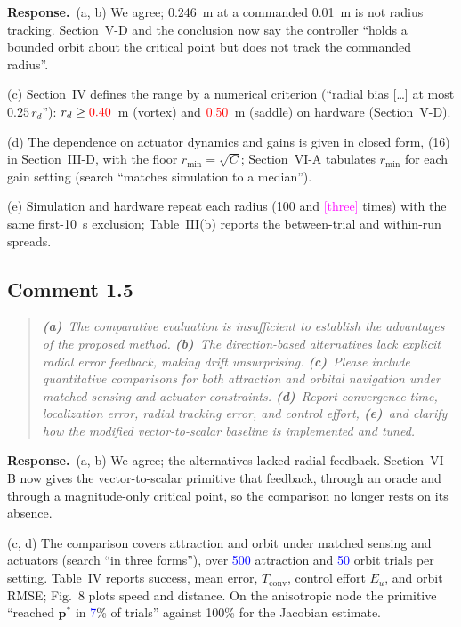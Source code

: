 \documentclass[10pt]{article}
\newcommand{\syn}[1]{\textcolor{red}{#1}}            %
\newcommand{\rev}[1]{#1}                             %
\newcommand{\open}[1]{\textcolor{magenta}{[#1]}}     %
\newcommand{\newnum}[1]{\textcolor{blue}{#1}}        %
\newcommand{\resp}{\par\textbf{Response.}~}
\begin{document}
\resp (a, b) We agree; 0.246~m at a commanded 0.01~m is not radius tracking. Section~V-D and the conclusion now say the controller ``holds a bounded orbit about the critical point but does not track the commanded radius''.

(c) Section~IV defines the range by a numerical criterion (``radial bias [\ldots] at most $0.25\,r_d$''): $r_d \ge \syn{0.40}$~m (vortex) and $\syn{0.50}$~m (saddle) on hardware (Section~V-D).

(d) The dependence on actuator dynamics and gains is given in closed form, (16) in Section~III-D, with the floor $r_{\min} = \sqrt{C}$; Section~VI-A tabulates $r_{\min}$ for each gain setting (search ``matches simulation to a median'').

(e) Simulation and hardware repeat each radius (\rev{100} and \open{three} times) with the same first-10~s exclusion; Table~III(b) reports the between-trial and within-run spreads.

\subsection*{Comment 1.5}

\begin{quote}\itshape
\textbf{(a)}~The comparative evaluation is insufficient to establish the advantages of the proposed method.
\textbf{(b)}~The direction-based alternatives lack explicit radial error feedback, making drift unsurprising.
\textbf{(c)}~Please include quantitative comparisons for both attraction and orbital navigation under matched sensing and actuator constraints.
\textbf{(d)}~Report convergence time, localization error, radial tracking error, and control effort,
\textbf{(e)}~and clarify how the modified vector-to-scalar baseline is implemented and tuned.
\end{quote}

\resp (a, b) We agree; the alternatives lacked radial feedback. Section~VI-B now gives the vector-to-scalar primitive that feedback, through an oracle and through a magnitude-only critical point, so the comparison no longer rests on its absence.

(c, d) The comparison covers attraction and orbit under matched sensing and actuators (search ``in three forms''), over \newnum{500} attraction and \newnum{50} orbit trials per setting. Table~IV reports success, mean error, $T_{\mathrm{conv}}$, control effort $E_u$, and orbit RMSE; Fig.~8 plots speed and distance. On the anisotropic node the primitive ``reached $\mathbf{p}^*$ in \newnum{7}\% of trials'' against 100\% for the Jacobian estimate.
\end{document}

